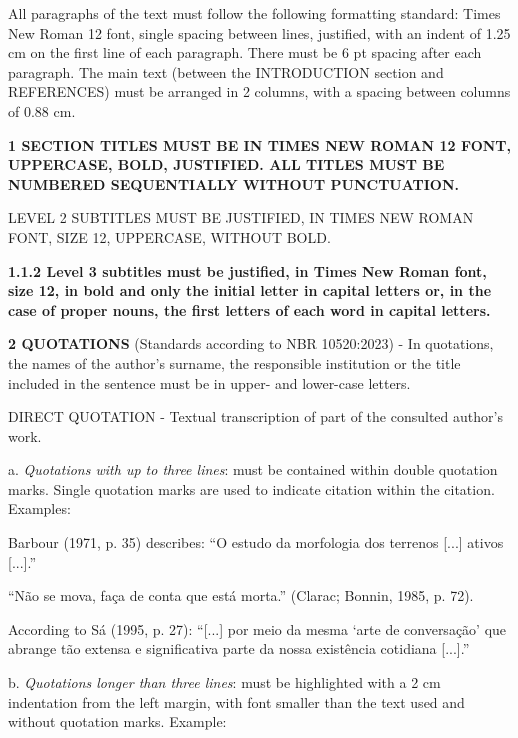 \documentclass[revista,english,oneside]{ifes8}
\begin{document}
All paragraphs of the text must follow the following formatting standard: Times New
Roman 12 font, single spacing between lines, justified, with an indent of 1.25 cm on the
first line of each paragraph. There must be 6 pt spacing after each paragraph. The main
text (between the INTRODUCTION section and REFERENCES) must be arranged in 2 columns,
with a spacing between columns of 0.88 cm.

\vspace{2mm}
\noindent\textbf{1 SECTION TITLES MUST BE IN TIMES NEW ROMAN 12 FONT, UPPERCASE, BOLD,
JUSTIFIED. ALL TITLES MUST BE NUMBERED SEQUENTIALLY WITHOUT PUNCTUATION.}

\vspace{2mm}
 LEVEL 2 SUBTITLES MUST BE JUSTIFIED, IN TIMES NEW ROMAN FONT, SIZE 12,
UPPERCASE, WITHOUT BOLD.

\vspace{2mm}
\noindent\textbf{1.1.2 Level 3 subtitles must be justified, in Times New Roman font,
size 12, in bold and only the initial letter in capital letters or, in the case of
proper nouns, the first letters of each word in capital letters.}

\vspace{4mm}
\noindent\textbf{2 QUOTATIONS} (Standards according to NBR 10520:2023) - In quotations,
the names of the author's surname, the responsible institution or the title included in
the sentence must be in upper- and lower-case letters.

\vspace{2mm}
 DIRECT QUOTATION - Textual transcription of part of the consulted author's
work.

\vspace{2mm}
\noindent a. \textit{Quotations with up to three lines}: must be contained within double
quotation marks. Single quotation marks are used to indicate citation within the
citation. Examples:

Barbour (1971, p. 35) describes: ``O estudo da morfologia dos terrenos [...] ativos
[...].''

``Não se mova, faça de conta que está morta.'' (Clarac; Bonnin, 1985, p. 72).

According to Sá (1995, p. 27): ``[...] por meio da mesma `arte de conversação' que
abrange tão extensa e significativa parte da nossa existência cotidiana [...].''

\vspace{2mm}
\noindent b. \textit{Quotations longer than three lines}: must be highlighted with a 2
cm indentation from the left margin, with font smaller than the text used and without
quotation marks. Example:
\end{document}
